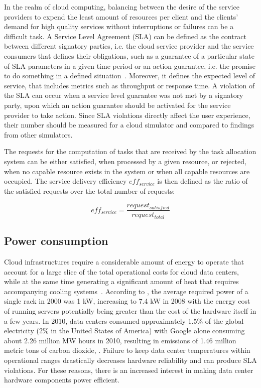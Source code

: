 In the realm of cloud computing, balancing between the desire of the service providers to expend the least amount of resources per client and the clients' demand for high quality services without interruptions or failures can be a difficult task. A Service Level Agreement (SLA) can be defined as the contract between different signatory parties, i.e.
the cloud service provider and the service consumers that defines their obligations, such as a guarantee of a particular state of SLA parameters in a given time period or an action guarantee, i.e. the promise to do something in a defined situation~\cite{ludwig2003web}. Moreover, it defines the expected level of service, that includes metrics such as throughput or response time. A violation of the SLA can occur when a service level guarantee was not met by a signatory party, upon which an action guarantee should be activated for the service provider to take action. Since SLA violations directly affect the user experience, their number should be measured for a cloud simulator and compared to findings from other simulators.


The requests for the computation of tasks that are received by the task allocation system can be either satisfied, when processed by a given resource, or rejected, when no capable resource exists in the system or when all capable resources are occupied. The service delivery efficiency $eff_{service}$ is then defined as the ratio of the satisfied requests over the total number of requests:

\begin{equation}
eff_{service} = \frac{request_{satisfied}}{request_{total}}
\end{equation}


\subsection{Power consumption}

Cloud infrastructures require a considerable amount of energy to operate that account for a large slice of the total operational costs for cloud data centers, while at the same time generating a significant amount of heat that requires accompanying cooling systems~\cite{Kliazovich2012}. According to \cite{CloudServices}, the average required power of a single rack in 2000 was 1 kW, increasing to 7.4 kW in 2008 with the energy cost of running servers potentially being greater than the cost of the hardware itself in a few years. In 2010, data centers consumed approximately 1.5\% of the global electricity (2\% in the United States of America) with Google alone consuming about 2.26 million MW hours in 2010, resulting in emissions of 1.46 million metric tons of carbon dioxide, \cite{awada}. Failure to keep data center temperatures within operational ranges drastically decreases hardware reliability and can produce SLA violations. For these reasons, there is an increased interest in making data center hardware components power efficient.

